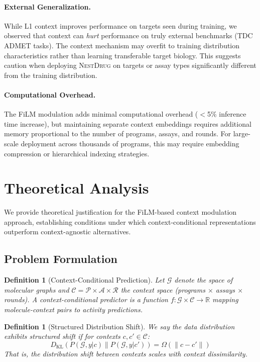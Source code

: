 \documentclass{article}
\newcommand{\methodname}{\textsc{NestDrug}}
\newtheorem{definition}[theorem]{Definition}
\begin{document}
\paragraph{External Generalization.}
While L1 context improves performance on targets seen during training, we observed that context can \textit{hurt} performance on truly external benchmarks (TDC ADMET tasks). The context mechanism may overfit to training distribution characteristics rather than learning transferable target biology. This suggests caution when deploying \methodname{} on targets or assay types significantly different from the training distribution.

\paragraph{Computational Overhead.}
The FiLM modulation adds minimal computational overhead ($<$5\% inference time increase), but maintaining separate context embeddings requires additional memory proportional to the number of programs, assays, and rounds. For large-scale deployment across thousands of programs, this may require embedding compression or hierarchical indexing strategies.

\section{Theoretical Analysis}
\label{app:theory}

We provide theoretical justification for the FiLM-based context modulation approach, establishing conditions under which context-conditional representations outperform context-agnostic alternatives.

\subsection{Problem Formulation}

\begin{definition}[Context-Conditional Prediction]
Let $\mathcal{G}$ denote the space of molecular graphs and $\mathcal{C} = \mathcal{P} \times \mathcal{A} \times \mathcal{R}$ the context space (programs $\times$ assays $\times$ rounds). A context-conditional predictor is a function $f: \mathcal{G} \times \mathcal{C} \rightarrow \mathbb{R}$ mapping molecule-context pairs to activity predictions.
\end{definition}

\begin{definition}[Structured Distribution Shift]
We say the data distribution exhibits \textit{structured shift} if for contexts $c, c' \in \mathcal{C}$:
\begin{equation}
    D_{\text{KL}}\left( P(\mathcal{G}, y | c) \| P(\mathcal{G}, y | c') \right) = \Omega(\|c - c'\|)
\end{equation}
That is, the distribution shift between contexts scales with context dissimilarity.
\end{definition}
\end{document}
